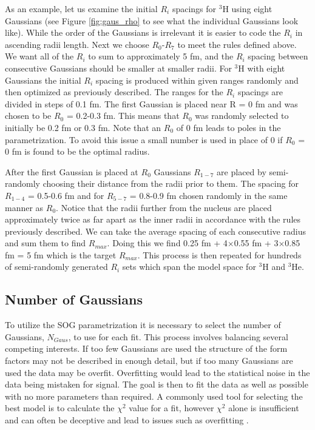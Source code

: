 As an example, let us examine the initial $R_i$ spacings for $^3$H using eight Gaussians (see Figure \ref{fig:gaus_rho} to see what the individual Gaussians look like). While the order of the Gaussians is irrelevant it is easier to code the $R_i$ in ascending radii length. Next we choose $R_0$-$R_7$ to meet the rules defined above. We want all of the $R_i$ to sum to approximately 5 fm, and the $R_i$ spacing between consecutive Gaussians should be smaller at smaller radii. For $^3$H with eight Gaussians the initial $R_i$ spacing is produced within given ranges randomly and then optimized as previously described. The ranges for the $R_i$ spacings are divided in steps of 0.1 fm. The first Gaussian is placed near R = 0 fm and was chosen to be $R_0$ = 0.2-0.3 fm. This means that $R_0$ was randomly selected to initially be 0.2 fm or 0.3 fm. Note that an $R_0$ of 0 fm leads to poles in the parametrization. To avoid this issue a small number is used in place of 0 if $R_0$ = 0 fm is found to be the optimal radius. 

After the first Gaussian is placed at $R_0$ Gaussians $R_{1-7}$ are placed by semi-randomly choosing their distance from the radii prior to them. The spacing for $R_{1-4}$ = 0.5-0.6 fm and for $R_{5-7}$ = 0.8-0.9 fm chosen randomly in the same manner as $R_0$. Notice that the radii further from the nucleus are placed approximately twice as far apart as the inner radii in accordance with the rules previously described. We can take the average spacing of each consecutive radius and sum them to find $R_{max}$. Doing this we find 0.25 fm + 4$\times$0.55 fm + 3$\times$0.85 fm = 5 fm which is the target $R_{max}$. This process is then repeated for hundreds of semi-randomly generated $R_i$ sets which span the model space for $^3$H and $^3$He. 

\subsection{Number of Gaussians}
\label{ssec:ngaus}

To utilize the SOG parametrization it is necessary to select the number of Gaussians, $N_{Gaus}$, to use for each fit. This process involves balancing several competing interests. If too few Gaussians are used the structure of the form factors may not be described in enough detail, but if too many Gaussians are used the data may be overfit. Overfitting would lead to the statistical noise in the data being mistaken for signal. The goal is then to fit the data as well as possible with no more parameters than required. A commonly used tool for selecting the best model is to calculate the $\chi^2$ value for a fit, however $\chi^2$ alone is insufficient and can often be deceptive and lead to issues such as overfitting \cite{doug_stats}. 


